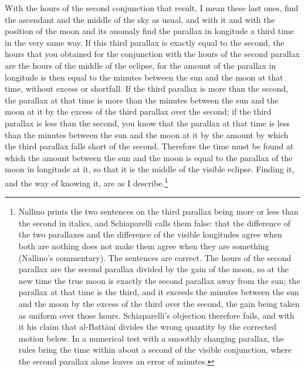 \documentclass[11pt]{article}
\begin{document}
\par With the hours of the second conjunction that result, I mean these last ones, find the ascendant and the middle of the sky as usual, and with it and with the position of the moon and its anomaly find the parallax in longitude a third time in the very same way. If this third parallax is exactly equal to the second, the hours that you obtained for the conjunction with the hours of the second parallax are the hours of the middle of the eclipse, for the amount of the parallax in longitude is then equal to the minutes between the sun and the moon at that time, without excess or shortfall. If the third parallax is more than the second, the parallax at that time is more than the minutes between the sun and the moon at it by the excess of the third parallax over the second; if the third parallax is less than the second, you know that the parallax at that time is less than the minutes between the sun and the moon at it by the amount by which the third parallax falls short of the second. Therefore the time must be found at which the amount between the sun and the moon is equal to the parallax of the moon in longitude at it, so that it is the middle of the visible eclipse. Finding it, and the way of knowing it, are as I describe.\footnote{Nallino prints the two sentences on the third parallax being more or less than the second in italics, and Schiaparelli calls them false: that the difference of the two parallaxes and the difference of the visible longitudes agree when both are nothing does not make them agree when they are something (Nallino's commentary). The sentences are correct. The hours of the second parallax are the second parallax divided by the gain of the moon, so at the new time the true moon is exactly the second parallax away from the sun; the parallax at that time is the third, and it exceeds the minutes between the sun and the moon by the excess of the third over the second, the gain being taken as uniform over those hours. Schiaparelli's objection therefore fails, and with it his claim that al-Battānī divides the wrong quantity by the corrected motion below. In a numerical test with a smoothly changing parallax, the rules bring the time within about a second of the visible conjunction, where the second parallax alone leaves an error of minutes.}\par
\end{document}
